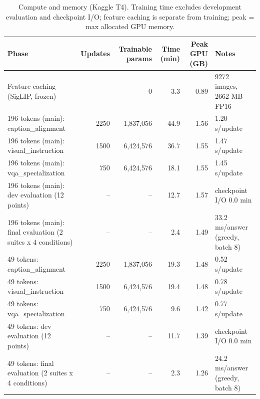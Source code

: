 \begin{table}[t]
\centering
\small
\caption{Compute and memory (Kaggle T4). Training time excludes development evaluation and checkpoint I/O; feature caching is separate from training; peak = max allocated GPU memory.}
\label{tab:t2_t6_resources}
\begin{tabular}{lrrrrl}
\toprule
Phase & Updates & Trainable params & Time (min) & Peak GPU (GB) & Notes \\
\midrule
Feature caching (SigLIP, frozen) & -- & 0 & 3.3 & 0.89 & 9272 images, 2662 MB FP16 \\
196 tokens (main): caption\_alignment & 2250 & 1,837,056 & 44.9 & 1.56 & 1.20 s/update \\
196 tokens (main): visual\_instruction & 1500 & 6,424,576 & 36.7 & 1.55 & 1.47 s/update \\
196 tokens (main): vqa\_specialization & 750 & 6,424,576 & 18.1 & 1.55 & 1.45 s/update \\
196 tokens (main): dev evaluation (12 points) & -- & -- & 12.7 & 1.57 & checkpoint I/O 0.0 min \\
196 tokens (main): final evaluation (2 suites x 4 conditions) & -- & -- & 2.4 & 1.49 & 33.2 ms/answer (greedy, batch 8) \\
49 tokens: caption\_alignment & 2250 & 1,837,056 & 19.3 & 1.48 & 0.52 s/update \\
49 tokens: visual\_instruction & 1500 & 6,424,576 & 19.4 & 1.48 & 0.78 s/update \\
49 tokens: vqa\_specialization & 750 & 6,424,576 & 9.6 & 1.42 & 0.77 s/update \\
49 tokens: dev evaluation (12 points) & -- & -- & 11.7 & 1.39 & checkpoint I/O 0.0 min \\
49 tokens: final evaluation (2 suites x 4 conditions) & -- & -- & 2.3 & 1.26 & 24.2 ms/answer (greedy, batch 8) \\
\bottomrule
\end{tabular}
\end{table}
